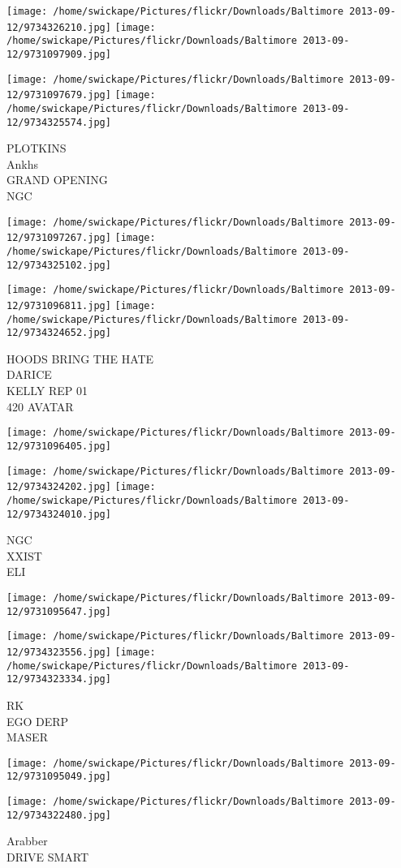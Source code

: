 \documentclass[10pt,letterpaper]{article}
\begin{document}
\texttt{[image: /home/swickape/Pictures/flickr/Downloads/Baltimore 2013-09-12/9734326210.jpg]}
\texttt{[image: /home/swickape/Pictures/flickr/Downloads/Baltimore 2013-09-12/9731097909.jpg]}

\texttt{[image: /home/swickape/Pictures/flickr/Downloads/Baltimore 2013-09-12/9731097679.jpg]}
\texttt{[image: /home/swickape/Pictures/flickr/Downloads/Baltimore 2013-09-12/9734325574.jpg]}

PLOTKINS\\
Ankhs\\
GRAND OPENING\\
NGC\\
\pagebreak

\texttt{[image: /home/swickape/Pictures/flickr/Downloads/Baltimore 2013-09-12/9731097267.jpg]}
\texttt{[image: /home/swickape/Pictures/flickr/Downloads/Baltimore 2013-09-12/9734325102.jpg]}

\texttt{[image: /home/swickape/Pictures/flickr/Downloads/Baltimore 2013-09-12/9731096811.jpg]}
\texttt{[image: /home/swickape/Pictures/flickr/Downloads/Baltimore 2013-09-12/9734324652.jpg]}

HOODS BRING THE HATE\\
DARICE\\
KELLY REP 01\\
420 AVATAR\\
\pagebreak

\texttt{[image: /home/swickape/Pictures/flickr/Downloads/Baltimore 2013-09-12/9731096405.jpg]}

\vspace{0.25in}
\texttt{[image: /home/swickape/Pictures/flickr/Downloads/Baltimore 2013-09-12/9734324202.jpg]}
\texttt{[image: /home/swickape/Pictures/flickr/Downloads/Baltimore 2013-09-12/9734324010.jpg]}

NGC\\
XXIST\\
ELI\\
\pagebreak

\texttt{[image: /home/swickape/Pictures/flickr/Downloads/Baltimore 2013-09-12/9731095647.jpg]}

\vspace{0.25in}
\texttt{[image: /home/swickape/Pictures/flickr/Downloads/Baltimore 2013-09-12/9734323556.jpg]}
\texttt{[image: /home/swickape/Pictures/flickr/Downloads/Baltimore 2013-09-12/9734323334.jpg]}

RK\\
EGO DERP\\
MASER\\
\pagebreak

\texttt{[image: /home/swickape/Pictures/flickr/Downloads/Baltimore 2013-09-12/9731095049.jpg]}

\vspace{0.25in}
\texttt{[image: /home/swickape/Pictures/flickr/Downloads/Baltimore 2013-09-12/9734322480.jpg]}

Arabber\\
DRIVE SMART\\
\pagebreak
\end{document}
